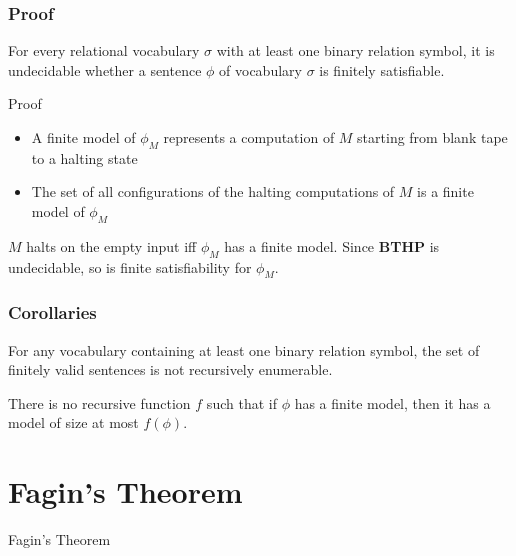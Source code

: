 \documentclass{beamer}
\begin{document}
\begin{frame}
  \frametitle{Proof}

  \begin{theorem}[Trakhtenbrot]
    For every relational vocabulary $\sigma$ with at least one binary relation
    symbol, it is undecidable whether a sentence $\phi$ of vocabulary
    $\sigma$ is finitely satisfiable.
  \end{theorem}
  
  \begin{alertblock}{Proof}

  \begin{itemize}
    \item A finite model of $\phi_M$ represents a computation of $M$ starting
    from blank tape to a halting state
    \item The set of all configurations of the halting computations of $M$ is a
    finite model of $\phi_M$
  \end{itemize}

  $M$ halts on the empty input iff $\phi_M$ has a finite model. Since
  \textbf{BTHP} is undecidable, so is finite satisfiability for $\phi_M$.
  \end{alertblock}
  
\end{frame}

\begin{frame}
  \frametitle{Corollaries}

  \begin{corollary}
    For any vocabulary containing at least one binary relation symbol, the set
    of finitely valid sentences is not recursively enumerable.
  \end{corollary}

  \begin{corollary}
    There is no recursive function $f$ such that if $\phi$ has a finite model,
    then it has a model of size at most $f(\phi)$.
  \end{corollary}
  
\end{frame}

\section{Fagin's Theorem}

\begin{frame}

\huge
\centering Fagin's Theorem
  
\end{frame}
\end{document}
